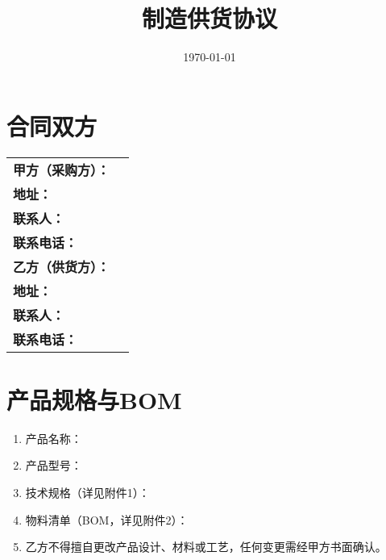 \documentclass[UTF8]{ctexart}
\title{制造供货协议}
\author{}
\date{\today}
\begin{document}
\maketitle

\section{合同双方}
\begin{tabular}{>{\bfseries}l l}
甲方（采购方）： & \underline{\hspace{8cm}} \\
地址： & \underline{\hspace{8cm}} \\
联系人： & \underline{\hspace{8cm}} \\
联系电话： & \underline{\hspace{8cm}} \\[1ex]
乙方（供货方）： & \underline{\hspace{8cm}} \\
地址： & \underline{\hspace{8cm}} \\
联系人： & \underline{\hspace{8cm}} \\
联系电话： & \underline{\hspace{8cm}} \\
\end{tabular}

\section{产品规格与BOM}
\begin{enumerate}
    \item 产品名称：\underline{\hspace{6cm}}
    \item 产品型号：\underline{\hspace{6cm}}
    \item 技术规格（详见附件1）：\underline{\hspace{6cm}}
    \item 物料清单（BOM，详见附件2）：\underline{\hspace{6cm}}
    \item 乙方不得擅自更改产品设计、材料或工艺，任何变更需经甲方书面确认。
\end{enumerate}
\end{document}
